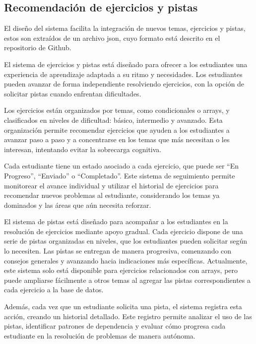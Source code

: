 \documentclass{article}
\begin{document}
\subsection{Recomendación de ejercicios y pistas}

El diseño del sistema facilita la integración de nuevos temas, ejercicios y pistas, estos son extraídos de un archivo json, cuyo formato está descrito en el repositorio de Github.

El sistema de ejercicios y pistas está diseñado para ofrecer a los estudiantes una experiencia de aprendizaje adaptada a su ritmo y necesidades. Los estudiantes pueden avanzar de forma independiente resolviendo ejercicios, con la opción de solicitar pistas cuando enfrentan dificultades.

Los ejercicios están organizados por temas, como condicionales o arrays, y clasificados en niveles de dificultad: básico, intermedio y avanzado. Esta organización permite recomendar ejercicios que ayuden a los estudiantes a avanzar paso a paso y a concentrarse en los temas que más necesitan o les interesan, intentando evitar la sobrecarga cognitiva.

Cada estudiante tiene un estado asociado a cada ejercicio, que puede ser ``En Progreso'', ``Enviado'' o ``Completado''. Este sistema de seguimiento permite monitorear el avance individual y utilizar el historial de ejercicios para recomendar nuevos problemas al estudiante, considerando los temas ya dominados y las áreas que aún necesita reforzar.


El sistema de pistas está diseñado para acompañar a los estudiantes en la resolución de ejercicios mediante apoyo gradual. Cada ejercicio dispone de una serie de pistas organizadas en niveles, que los estudiantes pueden solicitar según lo necesiten. Las pistas se entregan de manera progresiva, comenzando con consejos generales y avanzando hacia indicaciones más específicas. Actualmente, este sistema solo está disponible para ejercicios relacionados con arrays, pero puede ampliarse fácilmente a otros temas al agregar las pistas correspondientes a cada ejercicio a la base de datos.

Además, cada vez que un estudiante solicita una pista, el sistema registra esta acción, creando un historial detallado. Este registro permite analizar el uso de las pistas, identificar patrones de dependencia y evaluar cómo progresa cada estudiante en la resolución de problemas de manera autónoma.\\
\end{document}

